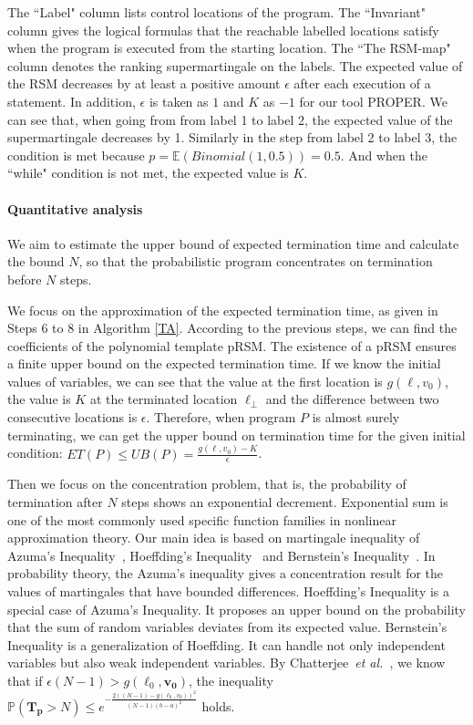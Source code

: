 \documentclass[runningheads]{llncs}
\begin{document}
The ``Label" column lists control locations of the program. The ``Invariant" column gives the logical formulas that the reachable labelled locations satisfy when the program is executed from the starting location. The ``The RSM-map" column denotes the ranking supermartingale on the labels. The expected value of the RSM decreases by at least a positive amount $\epsilon$ after each execution of a statement. In addition, $\epsilon$ is taken as $1$ and $K$ as $-1$ for our tool PROPER. We can see that, 
when going from from label 1 to label 2, the expected value of the supermartingale decreases by 1. Similarly  in the step from label 2 to label 3,  the condition is met because $p=\mathbb{E}(Binomial(1,0.5))=0.5$. And when the ``while" condition is not met, the expected value is $K$.

\paragraph{Quantitative analysis} We aim to estimate the upper bound of expected termination time and calculate the bound $N$, so that the probabilistic program concentrates on termination before $N$ steps. 

We focus on the approximation of the expected termination time, as given in Steps 6 to 8 in Algorithm \ref{TA}. According to the previous steps, we can find the coefficients of the polynomial template pRSM. The existence of a pRSM ensures a finite upper bound on the expected termination time. If we know the initial values of variables, we can see that the value at the first location is $g(\ell, v_0)$, the value is $K$ at the terminated location $\ell_\bot$ and the difference between two consecutive locations is $\epsilon$.  Therefore, when program $P$ is almost surely terminating, we can get the upper bound on termination time for the given initial condition: $ET(P) \leq UB(P) = \frac{g(\ell, v_0)-K}{\epsilon}$. 

Then we focus on the concentration problem, that is, the probability of termination after $N$ steps shows an exponential decrement. Exponential sum is one of the most commonly used specific function families in nonlinear approximation theory. Our main idea is based on martingale inequality of Azuma's Inequality~\cite{Azuma1967}, Hoeffding's Inequality~\cite{Hoeffding1963,McDiarmid1998Concentration}  and Bernstein's Inequality~\cite{Bennett1962,McDiarmid1998Concentration}. In probability theory, the Azuma's inequality gives a concentration result for the values of martingales that have bounded differences. Hoeffding's Inequality is a special case of Azuma's Inequality. It proposes an upper bound on the probability that the sum of random variables deviates from its expected value. Bernstein's Inequality is a generalization of Hoeffding. It can handle not only independent variables but also weak independent variables. By Chatterjee~\emph{et al.}~\cite{cha2015algorithmic}, we know that if $\epsilon(N-1) > g(\ell_0,\boldsymbol{v_0})$, the inequality $\mathbb{P}(\bm{T_p} > N)\leq e^{-\frac{2((N-1)-g(\ell_0,v_0))^2}{(N-1)(b-a)^2}}$ holds. 
\end{document}
